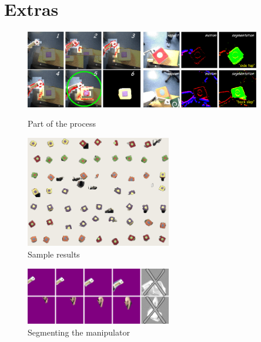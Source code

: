 
\section{Extras}


\begin{figure}[tbh]
  \begin{center}
    \includegraphics[width=2in]{collision-detail}
    \hspace{1in}
    \includegraphics[width=2in]{segmentation-detail}
  \end{center}
  \caption{Part of the process}
\end{figure}

\begin{figure}[tbh]
  \centerline{\includegraphics[width=2.5in]{experiment-montage}}
  \caption{Sample results}
  \label{fig:sample-results}
\end{figure}

\begin{figure}[tbh]
  \centerline{\includegraphics[width=2.5in]{manipulator-segment}}
  \caption{Segmenting the manipulator} 
  \label{fig:manipulator}
\end{figure}

